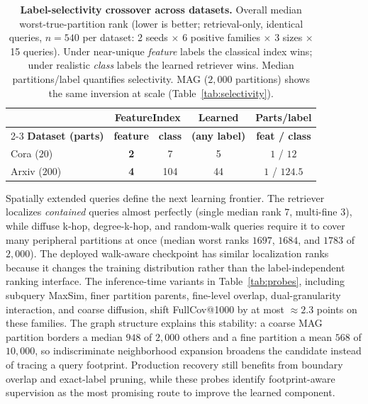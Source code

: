 \documentclass[runningheads]{llncs}
\begin{document}
\begin{table}[H]
\centering
\caption{\textbf{Label-selectivity crossover across datasets.} Overall median worst-true-partition rank (lower is better; retrieval-only, identical queries, $n{=}540$ per dataset: 2 seeds $\times$ 6 positive families $\times$ 3 sizes $\times$ 15 queries). Under near-unique \emph{feature} labels the classical index wins; under realistic \emph{class} labels the learned retriever wins. Median partitions/label quantifies selectivity. MAG ($2{,}000$ partitions) shows the same inversion at scale (Table~\ref{tab:selectivity}).}
\label{tab:selectivity_xd}
\small
\setlength{\tabcolsep}{6pt}
\begin{tabular}{lcccc}
\toprule
 & \multicolumn{2}{c}{\textbf{FeatureIndex}} & \textbf{Learned} & \textbf{Parts/label} \\
\cmidrule(lr){2-3}
\textbf{Dataset (parts)} & \textbf{feature} & \textbf{class} & \textbf{(any label)} & \textbf{feat / class} \\
\midrule
Cora ($20$)    & \textbf{2} & 7   & 5  & $1$ / $12$ \\
Arxiv ($200$)  & \textbf{4} & 104 & 44 & $1$ / $124.5$ \\
\bottomrule
\end{tabular}
\end{table}

Spatially extended queries define the next learning frontier. The retriever localizes \emph{contained} queries almost perfectly (single median rank $7$, multi-fine $3$), while diffuse k-hop, degree-k-hop, and random-walk queries require it to cover many peripheral partitions at once (median worst ranks $1697$, $1684$, and $1783$ of $2{,}000$). The deployed walk-aware checkpoint has similar localization ranks because it changes the training distribution rather than the label-independent ranking interface. The inference-time variants in Table~\ref{tab:probes}, including subquery MaxSim, finer partition parents, fine-level overlap, dual-granularity interaction, and coarse diffusion, shift FullCov@1000 by at most ${\approx}2.3$ points on these families. The graph structure explains this stability: a coarse MAG partition borders a median $948$ of $2{,}000$ others and a fine partition a mean $568$ of $10{,}000$, so indiscriminate neighborhood expansion broadens the candidate instead of tracing a query footprint. Production recovery still benefits from boundary overlap and exact-label pruning, while these probes identify footprint-aware supervision as the most promising route to improve the learned component.
\end{document}
